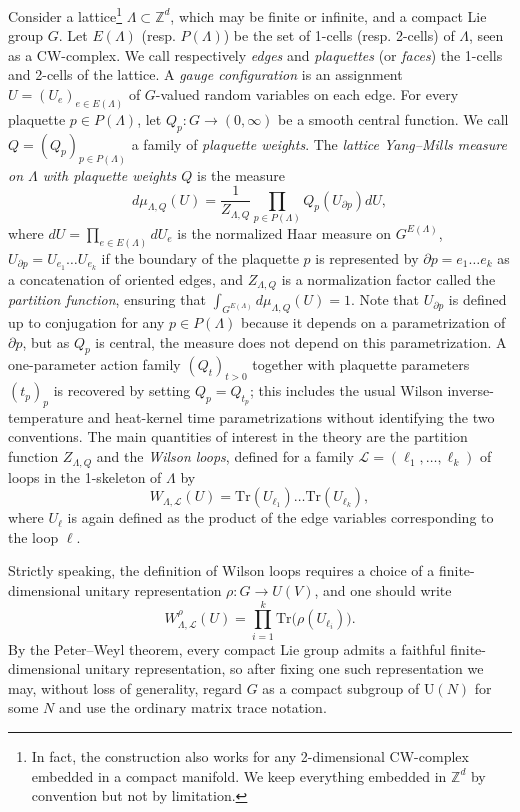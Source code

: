 \documentclass[11pt,a4paper,reqno]{article}
\theoremstyle{definition}
\theoremstyle{remark}
\newcommand\U{{\mathrm U}}
\newcommand\Z{{\mathbb Z}}
\newcommand\Tr{\mathrm{Tr}}
\newcommand\Lc{{\mathcal{L}}}
\begin{document}
Consider a lattice\footnote{In fact, the construction also works for any 2-dimensional CW-complex embedded in a compact manifold. We keep everything embedded in $\Z^d$ by convention but not by limitation.} $\Lambda\subset\Z^d$, which may be finite or infinite, and a compact Lie group $G$. Let $E(\Lambda)$ (resp. $P(\Lambda)$) be the set of 1-cells (resp. 2-cells) of $\Lambda$, seen as a CW-complex. We call respectively \emph{edges} and \emph{plaquettes} (or \emph{faces}) the 1-cells and 2-cells of the lattice. A \emph{gauge configuration} is an assignment $U=(U_e)_{e\in E(\Lambda)}$ of $G$-valued random variables on each edge. For every plaquette $p\in P(\Lambda)$, let $Q_p:G\to(0,\infty)$ be a smooth central function. We call $Q=(Q_p)_{p\in P(\Lambda)}$ a family of \emph{plaquette weights}. The \emph{lattice Yang--Mills measure on $\Lambda$ with plaquette weights $Q$} is the measure
\begin{equation}\label{eq:lattice-YM}
d\mu_{\Lambda,Q}(U)=\frac{1}{Z_{\Lambda,Q}}\prod_{p\in P(\Lambda)}Q_p(U_{\partial p})dU,
\end{equation}
where $dU=\prod_{e\in E(\Lambda)}dU_e$ is the normalized Haar measure on $G^{E(\Lambda)}$, $U_{\partial p}=U_{e_1}\ldots U_{e_k}$ if the boundary of the plaquette $p$ is represented by $\partial p=e_1\ldots e_k$ as a concatenation of oriented edges, and $Z_{\Lambda,Q}$ is a normalization factor called the \emph{partition function}, ensuring that $\int_{G^{E(\Lambda)}}d\mu_{\Lambda,Q}(U)=1$. Note that $U_{\partial p}$ is defined up to conjugation for any $p\in P(\Lambda)$ because it depends on a parametrization of $\partial p$, but as $Q_p$ is central, the measure does not depend on this parametrization. A one-parameter action family $(Q_t)_{t>0}$ together with plaquette parameters $(t_p)_p$ is recovered by setting $Q_p=Q_{t_p}$; this includes the usual Wilson inverse-temperature and heat-kernel time parametrizations without identifying the two conventions. The main quantities of interest in the theory are the partition function $Z_{\Lambda,Q}$ and the \emph{Wilson loops}, defined for a family $\Lc=(\ell_1,\ldots,\ell_k)$ of loops in the 1-skeleton of $\Lambda$ by
\begin{equation}
W_{\Lambda,\Lc}(U)=\Tr(U_{\ell_1})\ldots\Tr(U_{\ell_k}),
\end{equation}
where $U_\ell$ is again defined as the product of the edge variables corresponding to the loop $\ell$.

Strictly speaking, the definition of Wilson loops requires a choice of a finite-dimensional unitary representation $\rho:G\to U(V)$, and one should write
\[
W_{\Lambda,\Lc}^{\rho}(U)=\prod_{i=1}^k \Tr\big(\rho(U_{\ell_i})\big).
\]
By the Peter--Weyl theorem, every compact Lie group admits a faithful finite-dimensional unitary representation, so after fixing one such representation we may, without loss of generality, regard $G$ as a compact subgroup of $\U(N)$ for some $N$ and use the ordinary matrix trace notation.
\end{document}
